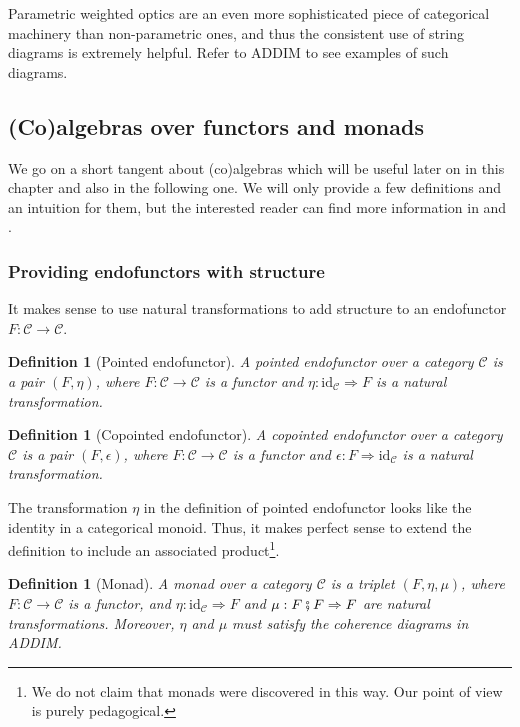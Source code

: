 \documentclass[12pt,a4paper,openright,twoside]{report}
\theoremstyle{plain}
\newtheorem{definition}[proposition]{Definition}
\theoremstyle{definition}
\begin{document}
Parametric weighted optics are an even more sophisticated piece of categorical machinery than non-parametric ones, and thus the consistent use of string diagrams is extremely helpful. Refer to ADDIM to see examples of such diagrams.


\subsection{(Co)algebras over functors and monads}
\label{subsec: algebras}


We go on a short tangent about (co)algebras which will be useful later on in this chapter and also in the following one. We will only provide a few definitions and an intuition for them, but the interested reader can find more information in \cite{jacobs1997tutorial} and \cite{wisbauer2008algebras}.


\subsubsection{Providing endofunctors with structure}

It makes sense to use natural transformations to add structure to an endofunctor $F: \mathcal{C} \to \mathcal{C}$.

\begin{definition}[Pointed endofunctor]
  \label{def: pointend}
  A pointed endofunctor over a category $\mathcal{C}$ is a pair $(F, \eta)$, where $F: \mathcal{C} \to \mathcal{C}$ is a functor and $\eta: \mathrm{id}_{\mathcal{C}} \Rightarrow F$ is a natural transformation. 
\end{definition}

\begin{definition}[Copointed endofunctor]\label{def: copointend}
  A copointed endofunctor over a category $\mathcal{C}$ is a pair $(F, \epsilon)$, where $F: \mathcal{C} \to \mathcal{C}$ is a functor and $\epsilon: F \Rightarrow \mathrm{id}_{\mathcal{C}}$ is a natural transformation. 
\end{definition}

The transformation $\eta$ in the definition of pointed endofunctor looks like the identity in a categorical monoid. Thus, it makes perfect sense to extend the definition to include an associated product\footnote{We do not claim that monads were discovered in this way. Our point of view is purely pedagogical.}.

\begin{definition}[Monad]
  \label{def: monad}
  A monad over a category $\mathcal{C}$ is a triplet $(F, \eta, \mu)$, where $F: \mathcal{C} \to \mathcal{C}$ is a functor, and $\eta: \mathrm{id}_{\mathcal{C}} \Rightarrow F$  and $\mu: F \fatsemi F \Rightarrow F$ are natural transformations. Moreover, $\eta$ and $\mu$ must satisfy the coherence diagrams in ADDIM.  
\end{definition}
\end{document}
